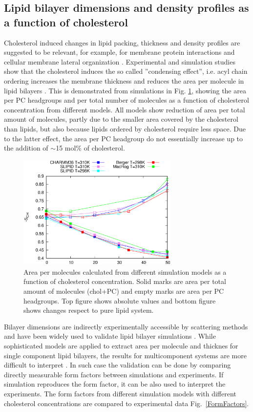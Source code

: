 \documentclass[aps,prl,superscriptaddress,twocolumn]{revtex4}
\begin{document}
\subsection{Lipid bilayer dimensions and density profiles as a function of cholesterol}
Cholesterol induced changes in lipid packing, thickness and density profiles are suggested
to be relevant, for example, for membrane protein interactions and cellular membrane
lateral organization \cite{??}. Experimental and simulation studies show that
the cholesterol induces the so called ''condensing effect'', i.e. acyl chain ordering
increases the membrane thickness and
reduces the area per molecule in lipid bilayers \cite{??}. This is demonstrated
from simulations in Fig. \ref{apls}, showing the area per PC headgroups and per
total number of molecules as a function of cholesterol concentration from different
models. All models show reduction of area per total amount of molecules, partly
due to the smaller area covered by the cholesterol than lipids, but also because
lipids ordered by cholesterol require less space. Due to the latter effect,
the area per PC headgroup do not essentially increase up to the addition of
$\sim$15 mol\% of cholesterol. \\
\begin{figure}[]
  \centering
  \includegraphics[width=8cm]{../FIGS/apls.eps}
  \caption{\label{apls}
    Area per molecules calculated from different simulation models
    as a function of cholesterol concentration. Solid marks are area per
    total amount of molecules (chol+PC) and empty marks are area per PC headgroups.
    Top figure shows absolute values and bottom figure shows changes respect
    to pure lipid system.
  }
\end{figure}

Bilayer dimensions are indirectly experimentally accessible by scattering methods 
and have been widely used to validate lipid bilayer simulations \cite{ollila16,??}. 
While sophisticated models are applied to extract area per molecule and thicknes for single
component lipid bilayers, the results for multicomponent systems are more difficult to interpret \cite{pan12,Heftberger15,Marquardt15,??}.
In such case the validation can be done by comparing directly measurable form factors between
simulations and experiments. If simulation reproduces the form factor, it can be also
used to interpret the experiments.  The form factors from different simulation models with
different cholesterol concentrations are compared to experimental data Fig.~\ref{FormFactors}. \\
\end{document}
